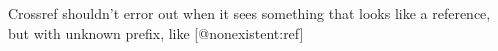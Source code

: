 Crossref shouldn't error out when it sees something that looks like a
reference, but with unknown prefix, like {[}@nonexistent:ref{]}
